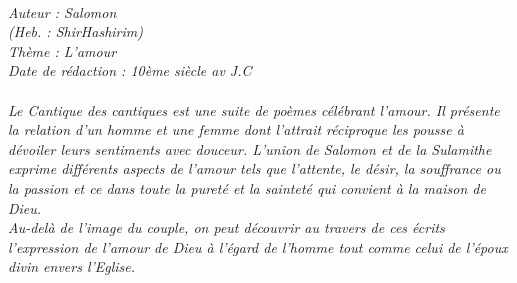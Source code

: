 \BFont
\noindent\hrulefill
{\footnotesize
\textit{
\bigskip
{\centering{}
\\Auteur : Salomon
\\(Heb. : ShirHashirim)
\\Thème : L'amour
\\Date de rédaction : 10ème siècle av J.C\\}
}
\textit{
\\Le Cantique des cantiques est une suite de poèmes célébrant l’amour. Il présente la relation d’un homme et une femme dont l’attrait réciproque les pousse à dévoiler leurs sentiments avec douceur. L’union de Salomon et de la Sulamithe exprime différents aspects de l’amour tels que l’attente, le désir, la souffrance ou la passion et ce dans toute la pureté et la sainteté qui convient à la maison de Dieu.
\\Au-delà de l’image du couple, on peut découvrir au travers de ces écrits l’expression de l’amour de Dieu à l’égard de l’homme tout comme celui de l’époux divin envers l’Eglise.\bigskip
}
}
\par\nobreak\noindent\hrulefill
